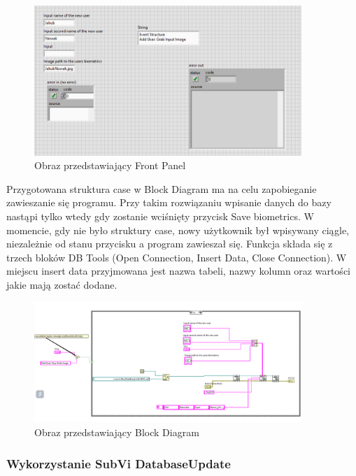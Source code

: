 \documentclass{report}
\begin{document}
\begin{figure}[H]
    \centering
    \includegraphics[width=0.9\textwidth]{src/Database/Database_write_subvi_frontpanel.png}
    \caption{Obraz przedstawiający Front Panel}
    \label{fig:first-att}
\end{figure}

Przygotowana struktura case w Block Diagram ma na celu zapobieganie zawieszanie się programu. Przy takim rozwiązaniu wpisanie danych do bazy
nastąpi tylko wtedy gdy zostanie wciśnięty przycisk Save biometrics. W momencie, gdy nie było struktury case, nowy użytkownik był wpisywany ciągle, niezależnie od stanu przycisku
a program zawieszał się.
Funkcja składa się z trzech bloków DB Tools (Open Connection, Insert Data, Close Connection). W miejscu insert data przyjmowana jest nazwa tabeli, nazwy kolumn oraz wartości jakie mają zostać dodane.

\begin{figure}[H]
    \centering
    \includegraphics[width=0.9\textwidth]{src/Database/Database_write_subvi.png}
    \caption{Obraz przedstawiający Block Diagram}
    \label{fig:first-att}
\end{figure}

\subsubsection{\large Wykorzystanie SubVi DatabaseUpdate}
\end{document}
